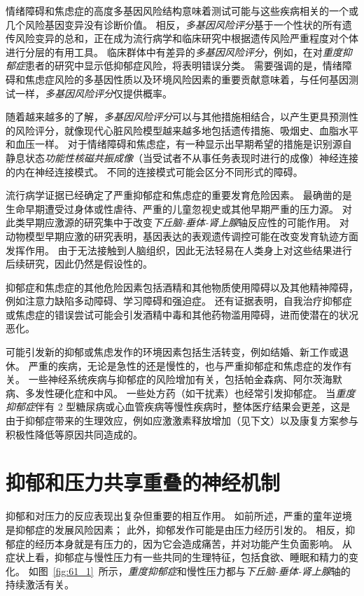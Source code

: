 情绪障碍和焦虑症的高度多基因风险结构意味着测试可能与这些疾病相关的一个或几个风险基因变异没有诊断价值。
相反，\textit{多基因风险评分}基于一个性状的所有遗传风险变异的总和，正在成为流行病学和临床研究中根据遗传风险严重程度对个体进行分层的有用工具。
临床群体中有差异的\textit{多基因风险评分}，例如，在对\textit{重度抑郁症}患者的研究中显示低抑郁症风险，将表明错误分类。
需要强调的是，情绪障碍和焦虑症风险的多基因性质以及环境风险因素的重要贡献意味着，与任何基因测试一样，\textit{多基因风险评分}仅提供概率。


随着越来越多的了解，\textit{多基因风险评分}可以与其他措施相结合，以产生更具预测性的风险评分，就像现代心脏风险模型越来越多地包括遗传措施、吸烟史、血脂水平和血压一样。
对于情绪障碍和焦虑症，有一种显示出早期希望的措施是识别源自静息状态\textit{功能性核磁共振成像}（当受试者不从事任务表现时进行的成像）神经连接的内在神经连接模式。
不同的连接模式可能会区分不同形式的障碍。


流行病学证据已经确定了严重抑郁症和焦虑症的重要发育危险因素。
最确凿的是生命早期遭受过身体或性虐待、严重的儿童忽视史或其他早期严重的压力源。
对此类早期应激源的研究集中于改变\textit{下丘脑-垂体-肾上腺}轴反应性的可能作用。
对动物模型早期应激的研究表明，基因表达的表观遗传调控可能在改变发育轨迹方面发挥作用。
由于无法接触到人脑组织，因此无法轻易在人类身上对这些结果进行后续研究，因此仍然是假设性的。


抑郁症和焦虑症的其他危险因素包括酒精和其他物质使用障碍以及其他精神障碍，例如注意力缺陷多动障碍、学习障碍和强迫症。
还有证据表明，自我治疗抑郁症或焦虑症的错误尝试可能会引发酒精中毒和其他药物滥用障碍，进而使潜在的状况恶化。


可能引发新的抑郁或焦虑发作的环境因素包括生活转变，例如结婚、新工作或退休。
严重的疾病，无论是急性的还是慢性的，也与严重抑郁症和焦虑症的发作有关。
一些神经系统疾病与抑郁症的风险增加有关，包括帕金森病、阿尔茨海默病、多发性硬化症和中风。
一些处方药（如干扰素）也经常引发抑郁症。
当\textit{重度抑郁症}伴有 2 型糖尿病或心血管疾病等慢性疾病时，整体医疗结果会更差，这是由于抑郁症带来的生理效应，例如应激激素释放增加（见下文）以及康复方案参与积极性降低等原因共同造成的。



\section{抑郁和压力共享重叠的神经机制}

抑郁和对压力的反应表现出复杂但重要的相互作用。
如前所述，严重的童年逆境是抑郁症的发展风险因素；
此外，抑郁发作可能是由压力经历引发的。
相反，抑郁症的经历本身就是有压力的，因为它会造成痛苦，并对功能产生负面影响。
从症状上看，抑郁症与慢性压力有一些共同的生理特征，包括食欲、睡眠和精力的变化。
如图~\ref{fig:61_1}~所示，\textit{重度抑郁症}和慢性压力都与\textit{下丘脑-垂体-肾上腺}轴的持续激活有关。


